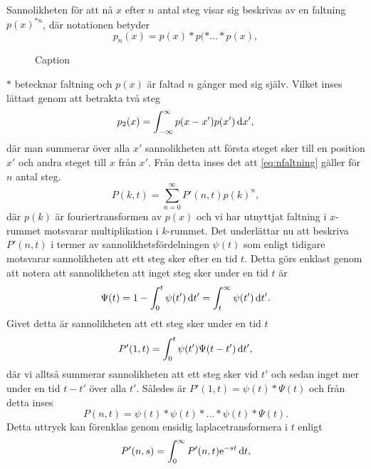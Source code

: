 Sannolikheten för att nå $x$ efter $n$ antal steg visar sig beskrivas av en faltning $p(x)^{*n}$, där notationen betyder 
\begin{equation}
p_n(x) = p(x)*p(*\ldots*p(x),
\end{equation}
\begin{figure}
    \centering
    
    \caption{Caption}
    \label{fig:ctrw}
\end{figure}
$*$ betecknar faltning och $p(x)$ är faltad $n$ gånger med sig själv. Vilket inses lättast genom att betrakta två steg
\begin{equation}\label{eq:nfaltning}
    p_2(x) = \int_{-\infty}^{\infty} p(x-x')p(x')\,\mathrm{d}{x'},
\end{equation}
där man summerar över alla $x'$ sannolikheten att första steget sker till en position $x'$ och andra steget till $x$ från $x'$. Från detta inses det att \eqref{eq:nfaltning} gäller för $n$ antal steg.
\begin{equation}\label{eq:Pfour}
P(k,t) =\sum_{n=0}^{\infty} P'(n,t)p(k)^n,
\end{equation}
där $p(k)$ är fouriertransformen av $p(x)$ och vi har utnyttjat faltning i $x$-rummet motsvarar multiplikation i $k$-rummet. Det underlättar nu att beskriva $P'(n,t)$ i termer av sannolikhetsfördelningen $\psi (t)$ som enligt tidigare motsvarar sannolikheten att ett steg sker efter en tid $t$. Detta görs enklast genom att notera att sannolikheten att inget steg sker under en tid $t$ är 
\begin{equation}\label{eq:nojump}
\Psi (t) = 1-\int_0^t \psi(t')\,\mathrm{d}{t'} = \int_t^{\infty} \psi(t')\,\mathrm{d}{t'}. 
\end{equation}
Givet detta är sannolikheten att ett steg sker under en tid $t$
\begin{equation}
P'(1,t) = \int_0^t\psi(t')\Psi(t-t')\,\mathrm{d}{t'},
\end{equation}
där vi alltså summerar sannolikheten att ett steg sker vid $t'$ och sedan inget mer under en tid $t-t'$ över alla $t'$. Således är $P'(1,t) = \psi(t)*\Psi(t)$ och från detta inses
\begin{equation}
P(n,t) = \psi(t)*\psi(t)*...*\psi(t)*\Psi(t).
\end{equation}
Detta uttryck kan förenklas genom ensidig laplacetransformera i $t$ enligt 
\begin{equation}
P'(n,s) = \int_0^\infty P'(n,t)\mathrm{e}^{-st}\,\mathrm{d}{t},
\end{equation}
